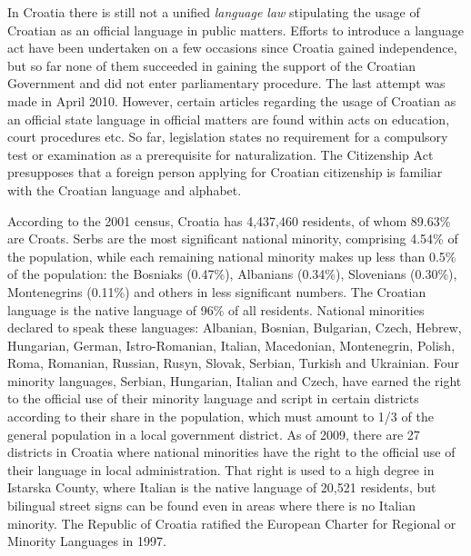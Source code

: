 \begin{multicols}{2}
In Croatia there is still not a unified \emph{language law} stipulating the usage of Croatian as an official language in public matters. Efforts to introduce a language act have been undertaken on a few occasions since Croatia gained independence, but so far none of them succeeded in gaining the support of the Croatian Government and did not enter parliamentary procedure. The last attempt was made in April 2010. However, certain articles regarding the usage of Croatian as an official state language in official matters are found within acts on education, court procedures etc. So far, legislation states no requirement for a compulsory test or examination as a prerequisite for naturalization. The Citizenship Act \cite{str6}  presupposes that a foreign person applying for Croatian citizenship is familiar with the Croatian language and alphabet.


According to the 2001 census, Croatia has 4,437,460 residents, of whom 89.63\% are Croats. Serbs are the most significant national minority, comprising 4.54\% of the population, while each remaining national minority makes up less than 0.5\% of the population: the Bosniaks (0.47\%), Albanians (0.34\%), Slovenians (0.30\%), Montenegrins (0.11\%) and others in less significant numbers. The Croatian language is the native language of 96\% of all residents. National minorities declared to speak these languages: Albanian, Bosnian, Bulgarian, Czech, Hebrew, Hungarian, German, Istro-Romanian, Italian, Macedonian, Montenegrin, Polish, Roma, Romanian, Russian, Rusyn, Slovak, Serbian, Turkish and Ukrainian. Four minority languages, Serbian, Hungarian, Italian and Czech, have earned the right to the official use of their minority language and script in certain districts according to their share in the population, which must amount to 1/3 of the general population in a local government district. As of 2009, there are 27 districts in Croatia where national minorities have the right to the official use of their language in local administration. That right is used to a high degree in Istarska County, where Italian is the native language of 20,521 residents, but bilingual street signs can be found even in areas where there is no Italian minority. The Republic of Croatia ratified the European Charter for Regional or Minority Languages in 1997.


\end{multicols}
